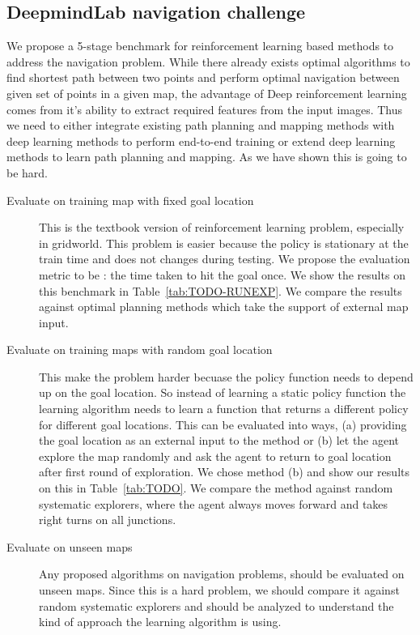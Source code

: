 \subsection{DeepmindLab navigation challenge}
We propose a 5-stage benchmark for reinforcement learning based methods to address the navigation problem.
While there already exists optimal algorithms to find shortest path between two points and perform optimal navigation between given set of points in a given map, the advantage of Deep reinforcement learning comes from it's ability to extract required features from the input images.
Thus we need to either integrate existing path planning and mapping methods with deep learning methods to perform end-to-end training or extend deep learning methods to learn path planning and mapping.
As we have shown this is going to be hard.
\begin{description}
  \item[Evaluate on training map with fixed goal location]
    This is the textbook version of reinforcement learning problem,
    especially in gridworld. This problem is easier because the policy
    is stationary at the train time and does not changes during
    testing.
    We propose the evaluation metric to be : the time taken to hit the goal once. We show the results on this benchmark in Table~\ref{tab:TODO-RUNEXP}.
    We compare the results against optimal planning methods which take the support of external map input.
  \item [Evaluate on training maps with random goal location]
    This make the problem harder becuase the policy function needs to depend up on the goal location.
    So instead of learning a static policy function the learning algorithm needs to learn a function that returns a different policy for different goal locations.
    This can be evaluated into ways, (a) providing the goal location as an external input to the method or (b) let the agent explore the map randomly and ask the agent to return to goal location after first round of exploration.
    We chose method (b) and show our results on this in Table~\ref{tab:TODO}.
    We compare the method against random systematic explorers, where the agent always moves forward and takes right turns on all junctions.
  \item [Evaluate on unseen maps]
    Any proposed algorithms on navigation problems, should be evaluated on unseen maps.
    Since this is a hard problem, we should compare it against random systematic explorers and should be analyzed to understand the kind of approach the learning algorithm is using.

\end{description}

